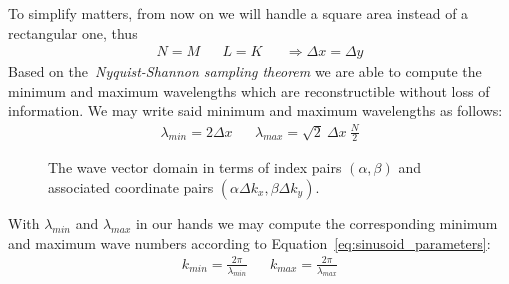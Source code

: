To simplify matters, from now on we will handle a square area instead of a
rectangular one, thus
\begin{align}
\label{eq:square_area}
 N = M && L = K &&\Rightarrow \Delta x = \Delta y
\end{align}
%
Based on the~\emph{Nyquist-Shannon sampling
theorem}\cite{book:bracewell2000fourier} we are able to compute the minimum and
maximum wavelengths which are reconstructible without loss of information.
We may write said minimum and maximum wavelengths as follows:
\begin{align}
 \lambda_{min} = 2\Delta x && \lambda_{max} = \sqrt{2}~\Delta x~\frac{N}{2}
\end{align}
%
\begin{figure}
\centering
{}
\caption{The wave vector domain in terms of index pairs $(\alpha,\beta)$ and
associated coordinate pairs $(\alpha\Delta k_x,\beta\Delta k_y)$.}
\label{fig:wave_vector_domain}
\end{figure}
%
With $\lambda_{min}$ and $\lambda_{max}$ in our hands we may compute the
corresponding minimum and maximum wave numbers according to
Equation~\ref{eq:sinusoid_parameters}:
\begin{align}
 k_{min} = \frac{2\pi}{\lambda_{min}} && k_{max} = \frac{2\pi}{\lambda_{max}}
\end{align}
